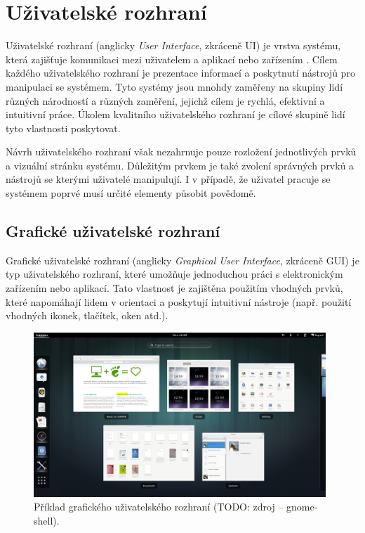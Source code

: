 \chapter{Uživatelské rozhraní}

Uživatelské rozhraní (anglicky \textit{User Interface}, zkráceně UI) je vrstva systému, která zajišťuje komunikaci mezi uživatelem a aplikací nebo zařízením \cite{smashing-ui}. Cílem každého uživatelského rozhraní je prezentace informací a poskytnutí nástrojů pro manipulaci se systémem. Tyto systémy jsou mnohdy zaměřeny na skupiny lidí různých národností a různých zaměření, jejichž cílem je rychlá, efektivní a intuitivní práce. Úkolem kvalitního uživatelského rozhraní je cílové skupině lidí tyto vlastnosti poskytovat.

Návrh uživatelského rozhraní však nezahrnuje pouze rozložení jednotlivých prvků a vizuální stránku systému. Důležitým prvkem je také zvolení správných prvků a nástrojů se kterými uživatelé manipulují. I v případě, že uživatel pracuje se systémem poprvé musí určité elementy působit povědomě.

\section{Grafické uživatelské rozhraní}

Grafické uživatelské rozhraní (anglicky \textit{Graphical User Interface}, zkráceně GUI) je typ uživatelského rozhraní, které umožňuje jednoduchou práci s elektronickým zařízením nebo aplikací. Tato vlastnost je zajištěna použitím vhodných prvků, které napomáhají lidem v orientaci a poskytují intuitivní nástroje (např. použití vhodných ikonek, tlačítek, oken atd.).

\begin{figure}[htbp]
    \centering
    \includegraphics[width=11cm]{images/gui-example.png}
    \caption{Příklad grafického uživatelského rozhraní (TODO: zdroj -- gnome-shell).}
\end{figure}


